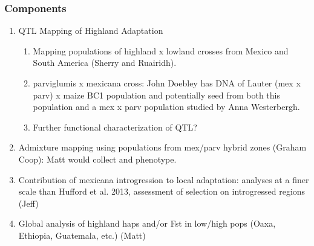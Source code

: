 \documentclass[]{article}
\begin{document}
\subsubsection*{Components}
\begin{enumerate}
	\item QTL Mapping of Highland Adaptation
	\begin{enumerate}
		\item  Mapping populations of highland x lowland crosses from Mexico and South America (Sherry and Ruairidh).
	
		\item parviglumis x mexicana cross: John Doebley has DNA of Lauter (mex x parv) x maize BC1 population and potentially seed from both this population and a mex x parv population studied by Anna Westerbergh.

		\item  Further functional characterization of QTL?
	 \end{enumerate}

	\item Admixture mapping using populations from mex/parv hybrid zones (Graham Coop): Matt would collect and phenotype.

	\item Contribution of mexicana introgression to local adaptation: analyses at a finer scale than Hufford et al. 2013, assessment of selection on introgressed regions (Jeff)

	\item Global analysis of highland haps and/or Fst in low/high pops (Oaxa, Ethiopia, Guatemala, etc.) (Matt)
\end{enumerate}
\end{document}
